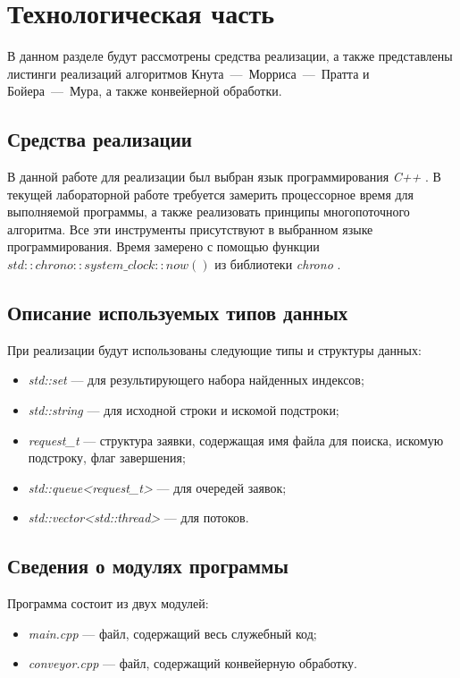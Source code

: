 \chapter{Технологическая часть}

В данном разделе будут рассмотрены средства реализации, а также представлены листинги реализаций алгоритмов Кнута~---~Морриса~---~Пратта и Бойера~---~Мура, а также конвейерной обработки.

\section{Средства реализации}

В данной работе для реализации был выбран язык программирования \textit{C++} \cite{cpp}. В текущей лабораторной работе требуется замерить процессорное
время для выполняемой программы, а также реализовать принципы многопоточного алгоритма. Все эти инструменты присутствуют в выбранном языке программирования.
Время замерено с помощью функции $std::chrono::system\_clock::now()$
из библиотеки \textit{chrono} \cite{chrono}. 

\section{Описание используемых типов данных}

При реализации будут использованы следующие типы и структуры данных:
\begin{itemize}[label=---]
	\item \textit{std::set} --- для результирующего набора найденных индексов;
	\item \textit{std::string} --- для исходной строки и искомой подстроки;
	\item \textit{request\_t} --- структура заявки, содержащая имя файла для поиска, искомую подстроку, флаг завершения;
	\item \textit{std::queue<request\_t>} --- для очередей заявок;
	\item \textit{std::vector<std::thread>} --- для потоков.
\end{itemize}

\section{Сведения о модулях программы}

Программа состоит из двух модулей:
\begin{itemize}[label={---}]
	\item \textit{main.cpp} --- файл, содержащий весь служебный код;
	\item \textit{conveyor.cpp} --- файл, содержащий конвейерную обработку.
\end{itemize}

